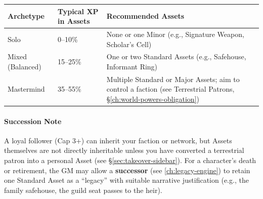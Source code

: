 \begin{center}
\begin{tabular}{lll}
\toprule
\textbf{Archetype} & \textbf{Typical XP in Assets} & \textbf{Recommended Assets} \\
\midrule
Solo & 0--10\% & None or one Minor (e.g., Signature Weapon, Scholar's Cell) \\
Mixed (Balanced) & 15--25\% & One or two Standard Assets (e.g., Safehouse, Informant Ring) \\
Mastermind & 35--55\% & Multiple Standard or Major Assets; aim to control a faction (see Terrestrial Patrons, \S\ref{ch:world-powers-obligation}) \\
\bottomrule
\end{tabular}
\end{center}

\paragraph{Succession Note}
A loyal follower (Cap 3+) can inherit your faction or network, but Assets themselves are not directly inheritable unless you have converted a terrestrial patron into a personal Asset (see \S\ref{sec:takeover-sidebar}). For a character's death or retirement, the GM may allow a \textbf{successor} (see \ref{ch:legacy-engine}) to retain one Standard Asset as a ``legacy'' with suitable narrative justification (e.g., the family safehouse, the guild seat passes to the heir).

